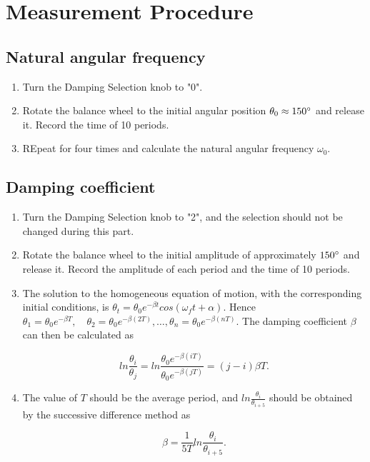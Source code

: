 \section{Measurement Procedure}

\subsection{Natural angular frequency}

\begin{enumerate}
\item Turn the Damping Selection knob to "0".
\item Rotate the balance wheel to the initial angular position $\theta_0 \approx
  150^\circ$ and release it. Record the time of 10 periods. 
\item REpeat for four times and calculate the natural angular frequency
  $\omega_0$. 
\end{enumerate}

\subsection{Damping coefficient}

\begin{enumerate}    
\item Turn the Damping Selection knob to "2", and the selection should not be
  changed during this part. 
\item Rotate the balance wheel to the initial amplitude of approximately
  $150^\circ$ and release it. Record the amplitude of each period and the time
  of 10 periods.  
\item The solution to the homogeneous equation of motion, with the corresponding
  initial conditions, is $\theta_{t}=\theta_0e^{-\beta t}cos(\omega_ft+\alpha)$.
  Hence $\theta_1=\theta_0e^{-\beta T}, \quad \theta_2=\theta_0e^{-\beta (2T)},
  \hdots, \theta_n=\theta_0e^{-\beta (nT)}$. The damping coefficient $\beta$ can
  then be calculated as 

\[ 
ln\frac{\theta_i}{\theta_j}=ln\frac{\theta_0e^{-\beta (iT)}}{\theta_0e^{-\beta
    (jT)}}=(j-i)\beta T. 
\]

\item The value of $T$ should be the average period, and
  $ln\frac{\theta_i}{\theta_{i+5}}$ should be obtained by the successive
  difference method as 

\[
\beta=\frac{1}{5T}ln\frac{\theta_i}{\theta_{i+5}}.
\]

\end{enumerate}

